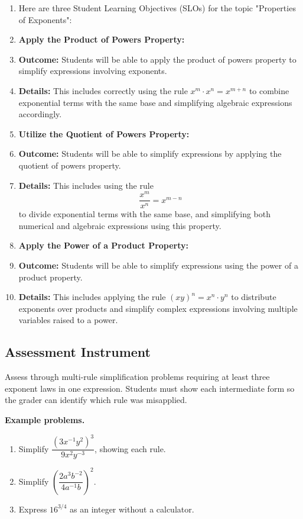 \begin{enumerate}
    \item Here are three Student Learning Objectives (SLOs) for the topic "Properties of Exponents":
    \item \textbf{Apply the Product of Powers Property:}
    \item \textbf{Outcome:} Students will be able to apply the product of powers property to simplify expressions involving exponents.
    \item \textbf{Details:} This includes correctly using the rule $x^m \cdot x^n = x^{m+n}$ to combine exponential terms with the same base and simplifying algebraic expressions accordingly.
    \item \textbf{Utilize the Quotient of Powers Property:}
    \item \textbf{Outcome:} Students will be able to simplify expressions by applying the quotient of powers property.
    \item \textbf{Details:} This includes using the rule $$\frac{x^m}{x^n} = x^{m-n}$$ to divide exponential terms with the same base, and simplifying both numerical and algebraic expressions using this property.
    \item \textbf{Apply the Power of a Product Property:}
    \item \textbf{Outcome:} Students will be able to simplify expressions using the power of a product property.
    \item \textbf{Details:} This includes applying the rule $(xy)^n = x^n \cdot y^n$ to distribute exponents over products and simplify complex expressions involving multiple variables raised to a power.
\end{enumerate}


\subsection{Assessment Instrument}
\label{ssec:asse-3669}


Assess through multi-rule simplification problems requiring at least
three exponent laws in one expression. Students must show each intermediate
form so the grader can identify which rule was misapplied.

\textbf{Example problems.}
\begin{enumerate}
    \item Simplify $\dfrac{(3x^{-1}y^2)^3}{9x^2y^{-3}}$, showing each rule.
    \item Simplify $\left(\dfrac{2a^3b^{-2}}{4a^{-1}b}\right)^2$.
    \item Express $16^{3/4}$ as an integer without a calculator.
\end{enumerate}



